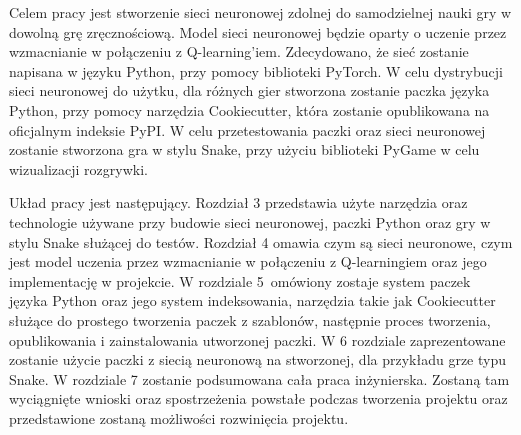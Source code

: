 Celem pracy jest stworzenie sieci neuronowej zdolnej do samodzielnej nauki gry w dowolną grę zręcznościową. Model sieci neuronowej będzie oparty o uczenie przez wzmacnianie w połączeniu z Q-learning'iem. Zdecydowano, że sieć zostanie napisana w języku Python, przy pomocy biblioteki PyTorch. W celu dystrybucji sieci neuronowej do użytku, dla różnych gier stworzona zostanie paczka języka Python, przy pomocy narzędzia Cookiecutter, która zostanie opublikowana na oficjalnym indeksie PyPI. W celu przetestowania paczki oraz sieci neuronowej zostanie stworzona gra w stylu Snake, przy użyciu biblioteki PyGame w celu wizualizacji rozgrywki.
\newline

Układ pracy jest następujący. Rozdział 3 przedstawia użyte narzędzia oraz technologie używane przy budowie sieci neuronowej, paczki Python oraz gry w stylu Snake służącej do testów. Rozdział 4 omawia czym są sieci neuronowe, czym jest model uczenia przez wzmacnianie w połączeniu z Q-learningiem oraz jego implementację w projekcie. W rozdziale 5~omówiony zostaje system paczek języka Python oraz jego system indeksowania, narzędzia takie jak Cookiecutter służące do prostego tworzenia paczek z szablonów, następnie proces tworzenia, opublikowania i zainstalowania utworzonej paczki. W 6 rozdziale zaprezentowane zostanie użycie paczki z siecią neuronową na stworzonej, dla przykładu grze typu Snake. W rozdziale 7 zostanie podsumowana cała praca inżynierska. Zostaną tam wyciągnięte wnioski oraz spostrzeżenia powstałe podczas tworzenia projektu oraz przedstawione zostaną możliwości rozwinięcia projektu.

